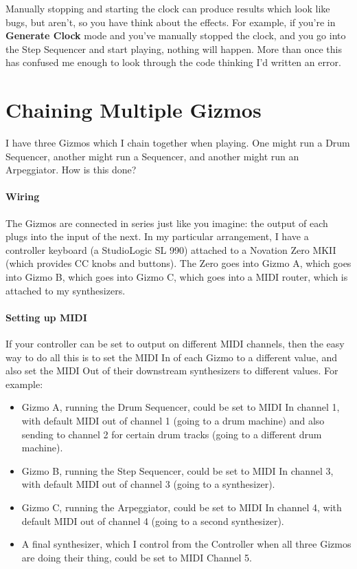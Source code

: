 \documentclass{article}
\begin{document}
		Manually stopping and starting the clock can produce results which look like bugs, but aren't, so you have think about the effects.  For example, if you're in {\bf Generate Clock} mode and you've manually stopped the clock, and you go into the Step Sequencer and start playing, nothing will happen. More than once this has confused me enough to look through the code thinking I'd written an error.
		

\section{Chaining Multiple Gizmos}

I have three Gizmos which I chain together when playing. One might run a Drum Sequencer, another might run a Sequencer, and another might run an Arpeggiator.  How is this done?

\paragraph{Wiring} The Gizmos are connected in series just like you imagine: the output of each plugs into the input of the next.  In my particular arrangement, I have a controller keyboard (a StudioLogic SL 990) attached to a Novation Zero MKII (which provides CC knobs and buttons).  The Zero goes into Gizmo A, which goes into Gizmo B, which goes into Gizmo C, which goes into a MIDI router, which is attached to my synthesizers.  

\paragraph{Setting up MIDI} If your controller can be set to output on different MIDI channels, then the easy way to do all this is to set the MIDI In of each Gizmo to a different value, and also set the MIDI Out of their downstream synthesizers to different values.  For example:

\begin{itemize}
\item Gizmo A, running the Drum Sequencer, could be set to MIDI In channel 1, with default MIDI out of channel 1 (going to a drum machine) and also sending to channel 2 for certain drum tracks (going to a different drum machine).  
\item Gizmo B, running the Step Sequencer, could be set to MIDI In channel 3, with default MIDI out of channel 3 (going to a synthesizer).
\item Gizmo C, running the Arpeggiator, could be set to MIDI In channel 4, with default MIDI out of channel 4 (going to a second synthesizer).
\item A final synthesizer, which I control from the Controller when all three Gizmos are doing their thing, could be set to MIDI Channel 5.
\end{itemize}
\end{document}
